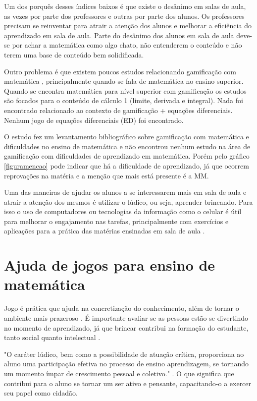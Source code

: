 Um dos porquês desses índices baixos é que existe o desânimo em salas de aula, as vezes por parte dos professores e outras por parte dos alunos. Os professores precisam se reinventar para atrair a atenção dos alunos e melhorar a eficiência do aprendizado em sala de aula. Parte do desânimo dos alunos em sala de aula deve-se por achar a matemática como algo chato, não entenderem o conteúdo e não terem uma base de conteúdo bem solidificada.

Outro problema é que existem poucos estudos relacionando gamificação com matemática \cite{revbibmatgam}, principalmente quando se fala de matemática no ensino superior. Quando se encontra matemática para nível superior com gamificação os estudos são focados para o conteúdo de cálculo 1 (limite, derivada e integral). Nada foi encontrado relacionado ao contexto de gamificação + equações diferenciais. Nenhum jogo de equações diferenciais (ED) foi encontrado.

O estudo \cite{revbibmatgam} fez um levantamento bibliográfico sobre gamificação com matemática e dificuldades no ensino de matemática e não encontrou nenhum estudo na área de gamificação com dificuldades de aprendizado em matemática. Porém pelo gráfico \ref{figuramencao} pode indicar que há a dificuldade de aprendizado, já que ocorrem reprovações na matéria e a menção que mais está presente é a MM.

Uma das maneiras de ajudar os alunos a se interessarem mais em sala de aula e atrair a atenção dos mesmos é utilizar o lúdico, ou seja, aprender brincando. Para isso o uso de computadores ou tecnologias da informação como o celular é útil para melhorar o engajamento nas tarefas, principalmente com exercícios e aplicações para a prática das matérias ensinadas em sala de aula \cite{tdahNasEscolas2}.


\section[Ajuda de jogos para ensino de matemática]{Ajuda de jogos para ensino de matemática}
Jogo é prática que ajuda na concretização do conhecimento, além de tornar o ambiente mais prazeroso \cite{jogoPratPedagoc}. É importante avaliar se as pessoas estão se divertindo no momento de aprendizado, já que brincar contribui na formação do estudante, tanto social quanto intelectual \cite{jogoPratPedagoc}.

"O caráter lúdico, bem como a possibilidade de atuação crítica, proporciona ao aluno uma participação efetiva no processo de ensino aprendizagem, se tornando um momento ímpar de crescimento pessoal e coletivo."  \cite{jogoPratPedagoc}. O que significa que contribui para o aluno se tornar um ser ativo e pensante, capacitando-o a exercer seu papel como cidadão.

